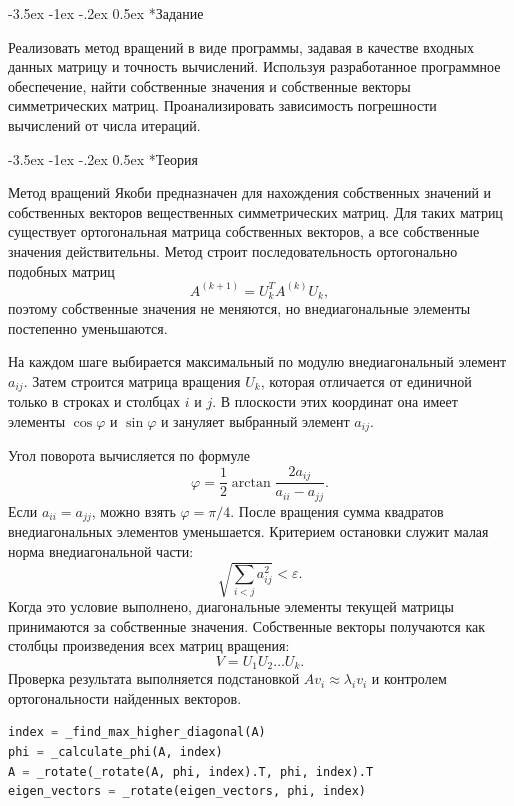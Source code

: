 \documentclass[14pt, a4paper]{article}
\makeatletter
\renewcommand\section{\@startsection {section}{1}{\parindent}%
  {-3.5ex \@plus -1ex \@minus -.2ex}%
  {0.5ex}%
  {\normalfont\Large\bfseries}}
\makeatother
\begin{document}
\section*{Задание}
Реализовать метод вращений в виде программы, задавая в качестве входных данных матрицу и точность вычислений. Используя разработанное программное обеспечение, найти собственные значения и собственные векторы симметрических матриц. Проанализировать зависимость погрешности вычислений от числа итераций.

\section*{Теория}
Метод вращений Якоби предназначен для нахождения собственных значений и собственных векторов вещественных симметрических матриц. Для таких матриц существует ортогональная матрица собственных векторов, а все собственные значения действительны. Метод строит последовательность ортогонально подобных матриц
\[
    A^{(k+1)} = U_k^T A^{(k)} U_k,
\]
поэтому собственные значения не меняются, но внедиагональные элементы постепенно уменьшаются.

На каждом шаге выбирается максимальный по модулю внедиагональный элемент $a_{ij}$. Затем строится матрица вращения $U_k$, которая отличается от единичной только в строках и столбцах $i$ и $j$. В плоскости этих координат она имеет элементы $\cos\varphi$ и $\sin\varphi$ и зануляет выбранный элемент $a_{ij}$.

Угол поворота вычисляется по формуле
\[
    \varphi = \frac12\arctan\frac{2a_{ij}}{a_{ii}-a_{jj}}.
\]
Если $a_{ii}=a_{jj}$, можно взять $\varphi=\pi/4$. После вращения сумма квадратов внедиагональных элементов уменьшается. Критерием остановки служит малая норма внедиагональной части:
\[
    \sqrt{\sum_{i<j} a_{ij}^2}<\varepsilon.
\]
Когда это условие выполнено, диагональные элементы текущей матрицы принимаются за собственные значения. Собственные векторы получаются как столбцы произведения всех матриц вращения:
\[
    V=U_1U_2\ldots U_k.
\]
Проверка результата выполняется подстановкой $Av_i\approx \lambda_i v_i$ и контролем ортогональности найденных векторов.

\begin{lstlisting}[language=Python]
index = _find_max_higher_diagonal(A)
phi = _calculate_phi(A, index)
A = _rotate(_rotate(A, phi, index).T, phi, index).T
eigen_vectors = _rotate(eigen_vectors, phi, index)
\end{lstlisting}
\end{document}
